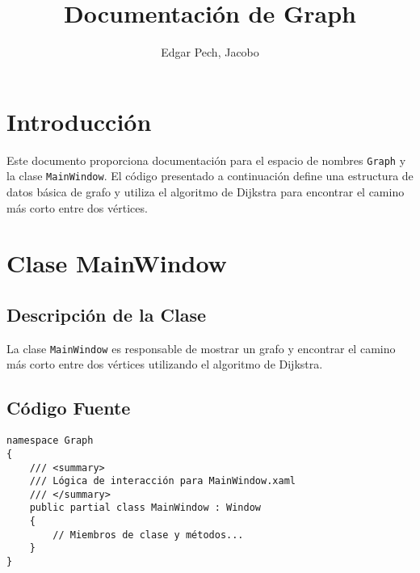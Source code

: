 \documentclass{article}
\begin{document}
\title{Documentación de Graph}
\author{Edgar Pech, Jacobo}
\maketitle

\tableofcontents

\section{Introducción}
Este documento proporciona documentación para el espacio de nombres \texttt{Graph} y la clase \texttt{MainWindow}. El código presentado a continuación define una estructura de datos básica de grafo y utiliza el algoritmo de Dijkstra para encontrar el camino más corto entre dos vértices.

\section{Clase MainWindow}
\subsection{Descripción de la Clase}
La clase \texttt{MainWindow} es responsable de mostrar un grafo y encontrar el camino más corto entre dos vértices utilizando el algoritmo de Dijkstra.

\subsection{Código Fuente}
\begin{lstlisting}[language={[Sharp]C}]
namespace Graph
{
    /// <summary>
    /// Lógica de interacción para MainWindow.xaml
    /// </summary>
    public partial class MainWindow : Window
    {
        // Miembros de clase y métodos...
    }
}
\end{lstlisting}
\end{document}

